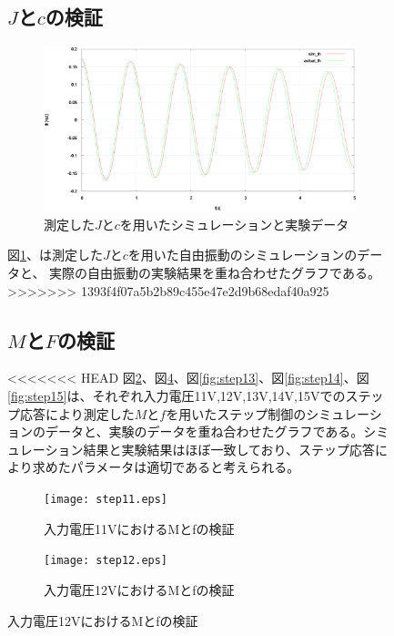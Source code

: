 \documentclass[a4j,11pt,twoside]{ujbook}
\begin{document}
\begin{figure}[htbp]
\begin{center}
	\subsection{$J$と$c$の検証}
	\begin{figure}[htbp]
		\begin{center}
			\includegraphics[width = 1.0 \linewidth]{freePendulum.eps}
			\caption{測定した$J$と$c$を用いたシミュレーションと実験データ}
			\label{fig:Jc}
		\end{center}
	\end{figure}
	図\ref{fig:Jc}、は測定した$J$と$c$を用いた自由振動のシミュレーションのデータと、
	実際の自由振動の実験結果を重ね合わせたグラフである。
>>>>>>> 1393f4f07a5b2b89c455e47e2d9b68edaf40a925

	\subsection{$M$と$F$の検証}

<<<<<<< HEAD
	図\ref{fig:step11}、図\ref{fig:step12}、図\ref{fig:step13}、図\ref{fig:step14}、図\ref{fig:step15}は、それぞれ入力電圧11V,12V,13V,14V,15Vでのステップ応答により測定した$M$と$f$を用いたステップ制御のシミュレーションのデータと、実験のデータを重ね合わせたグラフである。シミュレーション結果と実験結果はほぼ一致しており、ステップ応答により求めたパラメータは適切であると考えられる。
 \clearpage
	\begin{figure}[htbp]
		\begin{center}
			\texttt{[image: step11.eps]}
			\caption{入力電圧11VにおけるMとfの検証}
			\label{fig:step11}
		\end{center}
	\end{figure}

	\begin{figure}[htbp]
		\begin{center}
			\texttt{[image: step12.eps]}
			\caption{入力電圧12VにおけるMとfの検証}
			\label{fig:step12}
		\end{center}
	\end{figure}
	

\end{center}
\end{figure}
\end{document}
